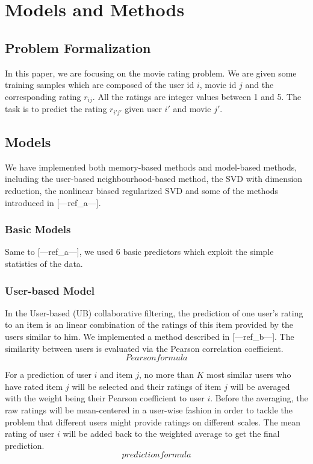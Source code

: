 \documentclass[10pt,conference,compsocconf]{IEEEtran}
\begin{document}
\section{Models and Methods}
\subsection{Problem Formalization}
In this paper, we are focusing on the movie rating problem. We are given some training samples which are composed of the user id $i$, movie id $j$ and the corresponding rating $r_{ij}$. All the ratings are integer values between 1 and 5. The task is to predict the rating $r_{i'j'}$ given user $i'$ and movie $j'$.

\subsection{Models}
We have implemented both memory-based methods and model-based methods, including the user-based neighbourhood-based method, the SVD with dimension reduction, the nonlinear biased regularized SVD and some of the methods introduced in [---ref\_a---].
\subsubsection{Basic Models}
Same to [---ref\_a---], we used 6 basic predictors which exploit the simple statistics of the data.

\subsubsection{User-based Model}
In the User-based (UB) collaborative filtering, the prediction of one user's rating to an item is an linear combination of the ratings of this item provided by the users similar to him. We implemented a method described in [---ref\_b---]. The similarity between users is evaluated via the Pearson correlation coefficient. $$Pearson formula$$

For a prediction of user $i$ and item $j$, no more than $K$ most similar users who have rated item $j$ will be selected and their ratings of item $j$ will be averaged with the weight being their Pearson coefficient to user $i$. Before the averaging, the raw ratings will be mean-centered in a user-wise fashion in order to tackle the problem that different users might provide ratings on different scales. The mean rating of user $i$ will be added back to the weighted average to get the final prediction. $$prediction formula$$
\end{document}
